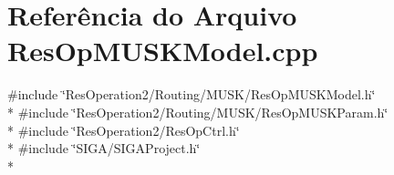 \section{Referência do Arquivo Res\+Op\+M\+U\+S\+K\+Model.\+cpp}
\label{_res_op_m_u_s_k_model_8cpp}
{\ttfamily \#include \char`\"{}Res\+Operation2/\+Routing/\+M\+U\+S\+K/\+Res\+Op\+M\+U\+S\+K\+Model.\+h\char`\"{}}\\*
{\ttfamily \#include \char`\"{}Res\+Operation2/\+Routing/\+M\+U\+S\+K/\+Res\+Op\+M\+U\+S\+K\+Param.\+h\char`\"{}}\\*
{\ttfamily \#include \char`\"{}Res\+Operation2/\+Res\+Op\+Ctrl.\+h\char`\"{}}\\*
{\ttfamily \#include \char`\"{}S\+I\+G\+A/\+S\+I\+G\+A\+Project.\+h\char`\"{}}\\*
